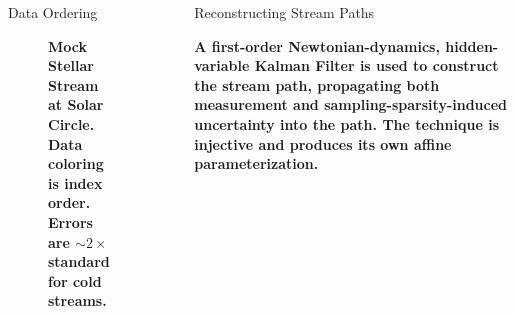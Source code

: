 \documentclass[final]{beamer}
\newlength{\sepwidth}
\newlength{\colwidth}
\newcommand{\separatorcolumn}{\begin{column}{\sepwidth}\end{column}}
\begin{document}
\begin{frame}[t]
\begin{columns}[t]
\begin{column}{\colwidth}
\begin{block}{Data Ordering}
            \begin{figure}
                \centering
                \captionsetup{justification=centering}
                \caption{\textbf{\normalsize{Mock Stellar Stream at Solar Circle.}
                         \newline
                         Data coloring is index order.
                         Errors are ${\sim2}\times$ standard for cold streams.}
                         \label{fig:data_ordering}}
                \quad
            \end{figure}

    \end{block}


\end{column}

\separatorcolumn

\begin{column}{\colwidth}

    \begin{block}{Reconstructing Stream Paths}

        \textbf{A first-order Newtonian-dynamics, hidden-variable Kalman Filter is used to construct the stream path, propagating both measurement and sampling-sparsity-induced uncertainty into the path. The technique is injective and produces its own affine parameterization.}


\end{block}
\end{column}
\end{columns}
\end{frame}
\end{document}

